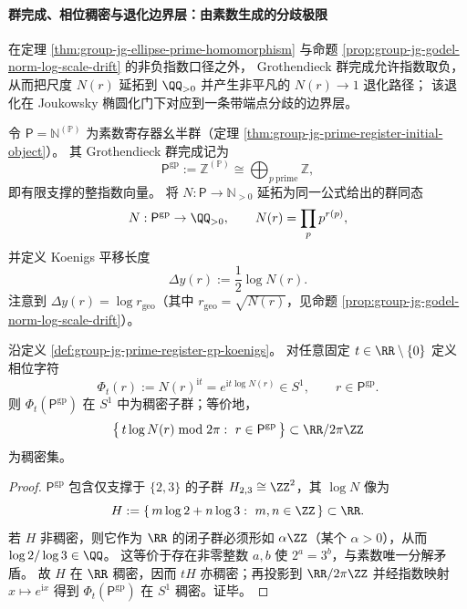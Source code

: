 

\paragraph{群完成、相位稠密与退化边界层：由素数生成的分歧极限}
在定理 \ref{thm:group-jg-ellipse-prime-homomorphism} 与命题 \ref{prop:group-jg-godel-norm-log-scale-drift} 的非负指数口径之外，
Grothendieck 群完成允许指数取负，从而把尺度 \(N(r)\) 延拓到 \(\QQ_{>0}\) 并产生非平凡的 \(N(r)\to 1\) 退化路径；
该退化在 Joukowsky 椭圆化门下对应到一条带端点分歧的边界层。

\begin{definition}\label{def:group-jg-prime-register-gp-koenigs}
令 \(\mathsf{P}=\mathbb N^{(\mathbb P)}\) 为素数寄存器幺半群（定理 \ref{thm:group-jg-prime-register-initial-object}）。
其 Grothendieck 群完成记为
\[
\mathsf{P}^{\mathrm{gp}}:=\mathbb Z^{(\mathbb P)}\cong \bigoplus_{p\ \mathrm{prime}}\mathbb Z,
\]
即有限支撑的整指数向量。
将 \(N:\mathsf P\to\mathbb N_{>0}\) 延拓为同一公式给出的群同态
\[
N:\mathsf{P}^{\mathrm{gp}}\to \QQ_{>0},\qquad
N(r)=\prod_{p}p^{r(p)},
\]
并定义 Koenigs 平移长度
\[
\Delta y(r):=\frac12\log N(r).
\]
注意到 \(\Delta y(r)=\log r_{\mathrm{geo}}\)（其中 \(r_{\mathrm{geo}}=\sqrt{N(r)}\)，见命题 \ref{prop:group-jg-godel-norm-log-scale-drift}）。
\end{definition}



\begin{theorem}\label{thm:group-jg-prime-register-phase-bohr-dense}
沿定义 \ref{def:group-jg-prime-register-gp-koenigs}。
对任意固定 \(t\in\RR\setminus\{0\}\) 定义相位字符
\[
\Phi_t(r):=N(r)^{\mathrm{i}t}=e^{\mathrm{i}t\log N(r)}\in S^1,\qquad r\in \mathsf{P}^{\mathrm{gp}}.
\]
则 \(\Phi_t(\mathsf{P}^{\mathrm{gp}})\) 在 \(S^1\) 中为稠密子群；等价地，
\[
\bigl\{\,t\log N(r)\bmod 2\pi:\ r\in \mathsf{P}^{\mathrm{gp}}\,\bigr\}
\subset \RR/2\pi\ZZ
\]
为稠密集。
\end{theorem}
\begin{proof}
\(\mathsf{P}^{\mathrm{gp}}\) 包含仅支撑于 \(\{2,3\}\) 的子群 \(H_{2,3}\cong\ZZ^2\)，其 \(\log N\) 像为
\[
H:=\{\,m\log 2+n\log 3:\ m,n\in\ZZ\,\}\subset\RR.
\]
若 \(H\) 非稠密，则它作为 \(\RR\) 的闭子群必须形如 \(\alpha\ZZ\)（某个 \(\alpha>0\)），从而 \(\log 2/\log 3\in\QQ\)。
这等价于存在非零整数 \(a,b\) 使 \(2^a=3^b\)，与素数唯一分解矛盾。
故 \(H\) 在 \(\RR\) 稠密，因而 \(tH\) 亦稠密；再投影到 \(\RR/2\pi\ZZ\) 并经指数映射 \(x\mapsto e^{\mathrm{i}x}\) 得到 \(\Phi_t(\mathsf{P}^{\mathrm{gp}})\) 在 \(S^1\) 稠密。证毕。
\end{proof}

